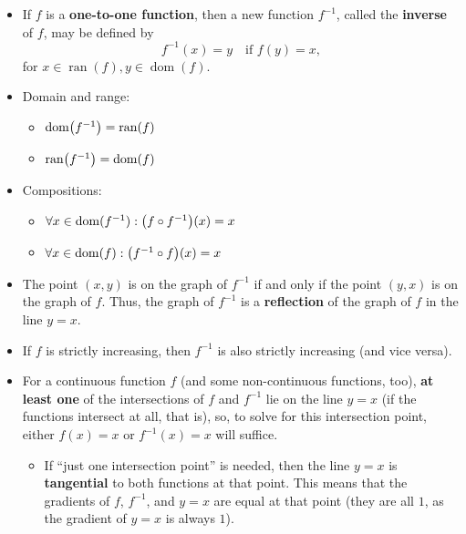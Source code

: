 \documentclass[12pt,a4paper,titlepage]{article}
\DeclareMathOperator{\dom}{dom}
\DeclareMathOperator{\ran}{ran}
\DeclarePairedDelimiter {\pars}  {  (      }     {  )      }
\begin{document}
            \begin{SummaryBox}[title=Inverse functions, sidebyside, right=0pt, righthand ratio=0.45]
                \begin{itemize}
                    \item If $f$ is a \textbf{one-to-one function}, then a new function $f^{-1}$, called the \textbf{inverse} of $f$, may be defined by
                    \[
                        f^{-1}(x) = y\quad \text{if }f(y) = x,
                    \]
                    for $x \in \ran(f), y \in \dom(f)$.
                    \item Domain and range:
                    \begin{itemize}[topsep=0pt]
                        \item $\dom\pars*{f^{-1}} = \ran(f)$
                        \item $\ran\pars*{f^{-1}} = \dom(f)$
                    \end{itemize}
                    \item Compositions:
                    \begin{itemize}[topsep=0pt]
                        \item $\forall x \in \dom(f^{-1}): \pars*{f \circ f^{-1}}(x) = x$
                        \item $\forall x \in \dom(f): \pars*{f^{-1} \circ f}(x) = x$
                    \end{itemize}
                    \item The point $(x,y)$ is on the graph of $f^{-1}$ if and only if the point $(y,x)$ is on the graph of $f$. Thus, the graph of $f^{-1}$ is a \textbf{reflection} of the graph of $f$ in the line $y=x$.
                    \item If $f$ is strictly increasing, then $f^{-1}$ is also strictly increasing (and vice versa).
                    \item For a continuous function $f$ (and some non-continuous functions, too), \textbf{at least one} of the intersections of $f$ and $f^{-1}$ lie on the line $y=x$ (if the functions intersect at all, that is), so, to solve for this intersection point, either $f(x) = x$ or $f^{-1}(x) = x$ will suffice.
                    \begin{itemize}[topsep=0pt]
                        \item If ``just one intersection point'' is needed, then the line $y=x$ is \textbf{tangential} to both functions at that point. This means that the gradients of $f$, $f^{-1}$, and $y=x$ are equal at that point (they are all $1$, as the gradient of $y=x$ is always $1$).

\end{itemize}
\end{itemize}
\end{SummaryBox}
\end{document}

